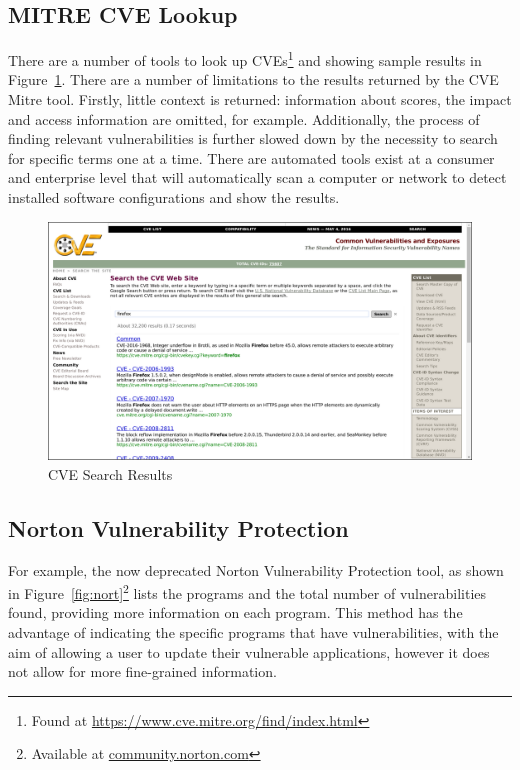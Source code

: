 \subsection{MITRE CVE Lookup}\label{sec:mit}

There are a number of tools to look up CVEs\footnote{Found at
	\url{https://www.cve.mitre.org/find/index.html}} and showing sample
results in Figure~\ref{fig:cve}.  There are a number of limitations to the
results returned by the CVE Mitre tool.  Firstly, little context is returned:
information about scores, the impact and access information are omitted, for
example.  Additionally, the process of finding relevant vulnerabilities is
further slowed down by the necessity to search for specific terms one at a
time.  There are automated tools exist at a consumer and enterprise level
that will automatically scan a computer or network to detect installed software
configurations and show the results.

\begin{figure} \centering \includegraphics[width=0.9\linewidth]{cve-lookup}
\caption{CVE Search Results}\label{fig:cve} \end{figure}

\subsection{Norton Vulnerability Protection}\label{sec:nor}

For example, the now deprecated Norton Vulnerability Protection tool, as shown
in Figure~\ref{fig:nort}\footnote{Available at \url{community.norton.com}}
lists the programs and the total number of  vulnerabilities found, providing
more information on each program.  This method has the advantage of indicating
the specific programs that have vulnerabilities, with the aim of allowing a
user to update their vulnerable applications, however it does not allow for
more fine-grained information.


